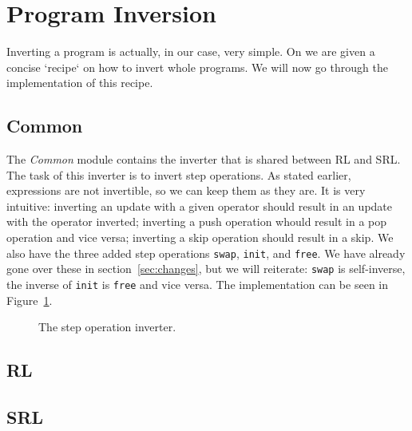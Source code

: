 \section{Program Inversion}

Inverting a program is actually, in our case, very simple. On \cite[p.~104]{REV} we are given a concise `recipe` on how to invert whole programs. We will now go through the implementation of this recipe.

\subsection{Common}

The \textit{Common} module contains the inverter that is shared between RL and SRL. The task of this inverter is to invert step operations. As stated earlier, expressions are not invertible, so we can keep them as they are. It is very intuitive: inverting an update with a given operator should result in an update with the operator inverted; inverting a push operation whould result in a pop operation and vice versa; inverting a skip operation should result in a skip. We also have the three added step operations \texttt{swap}, \texttt{init}, and \texttt{free}. We have already gone over these in section~\ref{sec:changes}, but we will reiterate: \texttt{swap} is self-inverse, the inverse of \texttt{init} is \texttt{free} and vice versa. The implementation can be seen in Figure~\ref{fig:commoninvert}.

\begin{figure}[H]
  
  \caption{The step operation inverter.}\label{fig:commoninvert}
\end{figure}

\subsection{RL}

\subsection{SRL}
